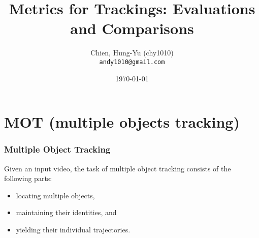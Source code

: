 \documentclass[slidestop,mathserif]{beamer}
\title[Metrics for Tracking]{Metrics for Trackings: {\small Evaluations and Comparisons}}
\author[chy1010]{\small Chien, Hung-Yu (chy1010) \\ {\scriptsize\tt andy1010@gmail.com}}
\date{\today}
\begin{document}
    \frame{\titlepage}


    \section{MOT (multiple objects tracking)}

    \begin{frame}
        \frametitle{Multiple Object Tracking}

        Given an input video, the task of multiple object tracking consists of the following parts:
        \begin{itemize}
        \item locating multiple objects,
        \item maintaining their identities, and
        \item yielding their individual trajectories.
        \end{itemize}






    \end{frame}
\end{document}
